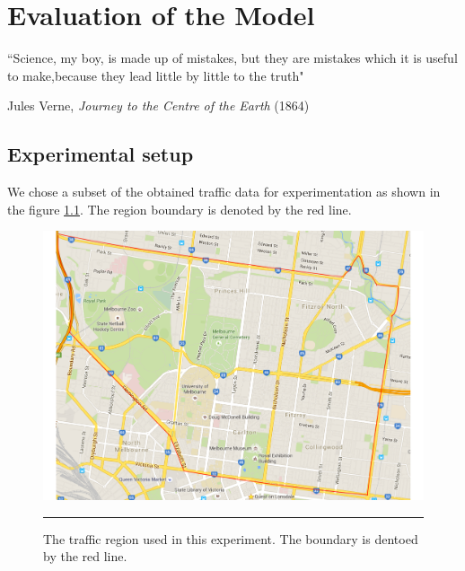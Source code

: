 
\chapter{Evaluation of the Model} %

\label{Chapter5} %


``Science, my boy, is made up of mistakes, but they are mistakes which it is useful to make,because
they lead little by little to the truth"

\begin{flushright}
Jules Verne, \textit{Journey to the Centre of the Earth} (1864)
\end{flushright}


\section{Experimental setup}

We chose a subset of the obtained traffic data for experimentation as shown in the figure
\ref{fig:ExperimentRegion}. The region boundary is denoted by the red line.

\begin{figure}[htbp]
  \centering
    \includegraphics[width=\textwidth,height=\textheight,keepaspectratio]{Figures/experiment-region.pdf}
    \rule{35em}{0.5pt}
  \caption[Experiment traffic region]{The traffic region used in this experiment. The boundary is
   dentoed by the red line.}
  \label{fig:ExperimentRegion}
\end{figure}

